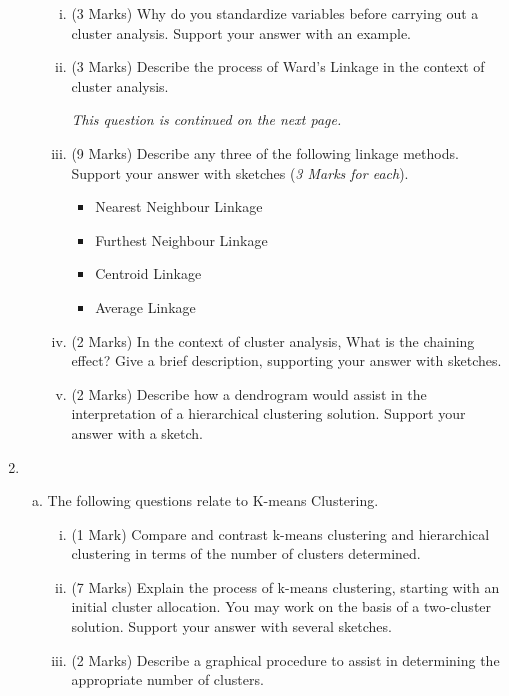 \documentclass[a4paper,12pt]{article}
\begin{document}
\begin{enumerate}
\begin{enumerate}[(a)]
\begin{enumerate}[(i)]
\item (3 Marks) Why do you standardize variables before carrying out a cluster analysis. Support your answer with an example.

\item (3 Marks) Describe the process of Ward's Linkage in the context of cluster analysis.


\noindent \textit{This question is continued on the next page.}
\newpage	
\item (9 Marks)  Describe any three of the following linkage methods. Support your answer with sketches (\textit{3 Marks for each}).
	\begin{itemize}
		\item Nearest Neighbour Linkage
		\item Furthest Neighbour Linkage
		\item Centroid Linkage
		\item Average Linkage
	\end{itemize}

	\item (2 Marks) In the context of cluster analysis, What is the chaining effect? Give a brief description, supporting your answer with sketches.
%	
	\item (2 Marks) Describe how a dendrogram would assist in the interpretation of a hierarchical clustering solution. Support your answer with a sketch.
	

	
\end{enumerate}


	
	\end{enumerate}

\newpage

	\item 
	\begin{enumerate}[(a)]


\item The following questions relate to K-means Clustering.

\begin{enumerate}[(i)]
	\item (1 Mark) Compare and contrast k-means clustering and hierarchical clustering in terms of the number of clusters determined.
	\item (7 Marks) Explain the process of k-means clustering, starting with an initial cluster allocation. 
	You may work on the basis of a two-cluster solution. Support your answer with several sketches.
	\item(2 Marks) Describe a graphical procedure to assist in determining the appropriate number of clusters.
	

\end{enumerate}
\end{enumerate}
\end{enumerate}
\end{document}
